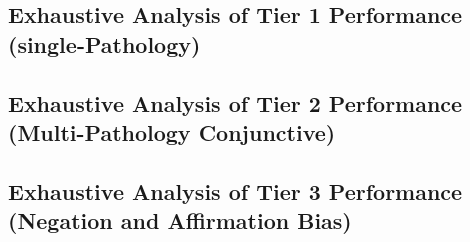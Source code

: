 \documentclass[10pt,twocolumn,letterpaper]{article}
\begin{document}
\begin{table}[h]
\centering
\caption{Macro-averaged metrics on pair label queries.}
\label{tab:robust_negation}
\end{table}

\begin{table}[h]
\centering
\caption{Macro-averaged metrics on `yes A and no B' queries.}
\label{tab:neg_queries}
\end{table}



\subsection{Exhaustive Analysis of Tier 1 Performance (single-Pathology)}

\subsection{Exhaustive Analysis of Tier 2 Performance (Multi-Pathology Conjunctive)}

\subsection{Exhaustive Analysis of Tier 3 Performance (Negation and Affirmation Bias)}
\end{document}
